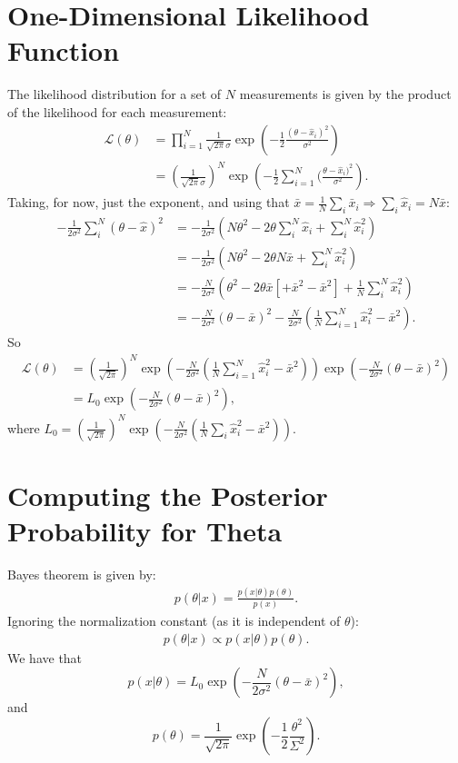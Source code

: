 \documentclass[a4paper,11pt,twoside]{article}
\begin{document}
\section{One-Dimensional Likelihood Function}
\label{sec:likelihood}
The likelihood distribution for a set of $N$ measurements is given by the product of the likelihood for each measurement:
\begin{align*}
	\mathcal{L}(\theta) &= \prod_{i=1}^{N} \frac{1}{\sqrt{2\pi}\sigma}\exp\left(-\frac{1}{2}\frac{(\theta - \hat{x}_i)^2}{\sigma^2}\right)
	\\ &= \left(\frac{1}{\sqrt{2\pi}\sigma}\right)^N \exp\left(-\frac{1}{2}\sum_{i=1}^{N}(\frac{\theta - \hat{x}_i)^2}{\sigma^2}\right).
\end{align*}
Taking, for now, just the exponent, and using that $\bar{x} = \frac{1}{N} \sum_i \bar{x}_i \Rightarrow \sum_i \hat{x}_i = N \bar{x}$:
\begin{align*}
	-\frac{1}{2\sigma^2}\sum_i^N(\theta - \hat{x})^2 &= -\frac{1}{2\sigma^2}(N\theta^2 - 2\theta \sum_i^N\hat{x}_i + \sum_i^N \hat{x}_i^2) 
	\\ &= -\frac{1}{2\sigma^2}(N\theta^2 - 2\theta N \bar{x} + \sum_i^N \hat{x}_i^2) 
	\\ &= -\frac{N}{2\sigma^2} (\theta^2 - 2\theta \bar{x} [ + \bar{x}^2 - \bar{x}^2]  + \frac{1}{N} \sum_i^N \hat{x}_i^2) 
	\\ &= -\frac{N}{2 \sigma^2} (\theta - \bar{x})^2 - \frac{N}{2 \sigma^2}(\frac{1}{N} \sum_{i=1}^{N} \hat{x}_i^2 - \bar{x}^2).
\end{align*}
So
\begin{align*}
	\mathcal{L}(\theta) &= \left( \frac{1}{\sqrt{2\pi}} \right)^N \exp \left(- \frac{N}{2 \sigma^2}(\frac{1}{N} \sum_{i=1}^{N} \hat{x}_i^2 - \bar{x}^2)\right) \exp \left(-\frac{N}{2 \sigma^2} (\theta - \bar{x})^2 \right)
	\\ &= L_0 \exp \left( -\frac{N}{2 \sigma^2} (\theta - \bar{x})^2 \right),
\end{align*}
where $L_0 = \left( \frac{1}{\sqrt{2\pi}} \right)^N \exp \left(- \frac{N}{2 \sigma^2}(\frac{1}{N} \sum_i \hat{x}_i^2 - \bar{x}^2)\right)$.

\section{Computing the Posterior Probability for Theta}
\label{sec:posterior}
Bayes theorem is given by:
\begin{align*}
	p(\theta|x) = \frac{p(x|\theta)p(\theta)}{p(x)}.
\end{align*}
Ignoring the normalization constant (as it is independent of $\theta$):
\begin{align*}
	p(\theta|x) \propto p(x|\theta)p(\theta).
\end{align*}
We have that
\begin{equation*}
	p(x|\theta) = L_0 \exp \left( -\frac{N}{2 \sigma^2} (\theta - \bar{x})^2 \right),
\end{equation*}
and
\begin{equation*}
	p(\theta) =  \frac{1}{\sqrt{2\pi}}\exp\left(-\frac{1}{2}\frac{\theta^2}{\Sigma^2}\right).
\end{equation*}
\end{document}
